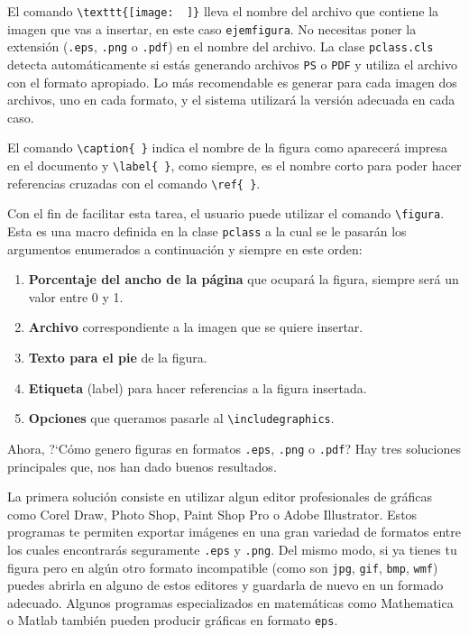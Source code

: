 El comando \verb|\texttt{[image:  ]}| lleva el nombre del archivo que contiene la imagen
que vas a insertar, en este caso \texttt{ejemfigura}. No necesitas poner la extensi\'on
(\texttt{.eps}, \texttt{.png} o \texttt{.pdf}) en el nombre del archivo. La clase
\texttt{pclass.cls} detecta autom\'aticamente si est\'as generando archivos \texttt{PS} o \texttt{PDF} 
y utiliza el archivo con el formato apropiado. Lo m\'as recomendable es generar para cada imagen dos
archivos, uno en cada formato, y el sistema utilizar\'a la versi\'on adecuada en cada caso.

El comando \verb|\caption{ }| indica el nombre de la figura como aparecer\'a impresa en el
documento y \verb|\label{ }|, como siempre, es el nombre corto para poder hacer referencias
cruzadas con el comando \verb|\ref{ }|.

Con  el fin de facilitar esta tarea, el usuario puede utilizar el comando \verb+\figura+. 
Esta es una macro definida en la clase \texttt{pclass} a la cual se le pasar\'an los argumentos enumerados a 
continuaci\'on y siempre en este orden:

\begin{enumerate}
	\item \textbf{Porcentaje del ancho de la p\'agina} que ocupar\'a la figura, siempre ser\'a un valor entre 0 y 1.
	\item \textbf{Archivo} correspondiente a la imagen que se quiere insertar.
	\item \textbf{Texto para el pie} de la figura.
	\item \textbf{Etiqueta} (label) para hacer referencias a la figura insertada.
	\item \textbf{Opciones} que queramos pasarle al \verb+\includegraphics+.
\end{enumerate}


Ahora, ?`C\'omo genero figuras en formatos
\texttt{.eps}, \texttt{.png} o \texttt{.pdf}? Hay tres soluciones principales
que, nos han dado buenos resultados.

La primera soluci\'on consiste en utilizar
algun editor profesionales de gr\'aficas como Corel Draw, Photo Shop, Paint Shop Pro
o Adobe Illustrator. Estos programas te permiten exportar im\'agenes en una gran
variedad de formatos entre los cuales encontrar\'as seguramente \texttt{.eps} y
\texttt{.png}. Del mismo modo, si ya tienes tu figura pero en alg\'un otro formato
incompatible (como son \texttt{jpg}, \texttt{gif}, \texttt{bmp}, \texttt{wmf}) puedes
abrirla en alguno de estos editores y guardarla de nuevo en un formado adecuado.
Algunos programas especializados en matem\'aticas como Mathematica o Matlab
tambi\'en pueden producir gr\'aficas en formato \texttt{eps}.

